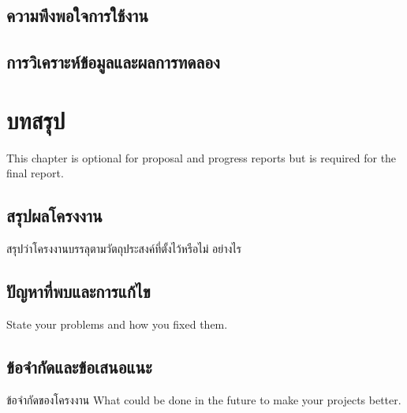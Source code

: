 \documentclass[12pt,oneside,openright,a4paper]{cpe-thai-project}
\begin{document}
\section{ความพึงพอใจการใช้งาน}
\section{การวิเคราะห์ข้อมูลและผลการทดลอง}

\chapter{บทสรุป}

This chapter is optional for proposal and progress reports but 
is required for the final report.

\section{สรุปผลโครงงาน}
สรุปว่าโครงงานบรรลุตามวัตถุประสงค์ที่ตั้งไว้หรือไม่ อย่างไร 

\section{ปัญหาที่พบและการแก้ไข}
State your problems and how you fixed them.

\section{ข้อจำกัดและข้อเสนอแนะ}
ข้อจำกัดของโครงงาน What could be done in the future to make your projects better.


\nocite{*}



 \\
\end{document}
